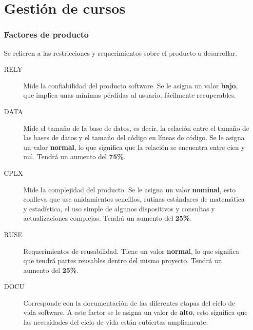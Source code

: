 \documentclass[11pt,a4paper,spanish,twoside]{book}
\begin{document}
\section{Gestión de cursos}
\subsubsection{Factores de producto}
Se refieren a las restricciones y requerimientos sobre el producto a
desarrollar.
\begin{description}
\item[RELY] Mide la confiabilidad del producto software. Se le asigna un 
valor \textbf{bajo}, que implica unas mínimas pérdidas al usuario,
fácilmente recuperables.

\item[DATA] Mide el tamaño de la base de datos, es decir, la relación entre
el tamaño de las bases de datos y el tamaño del código en líneas de código. Se
le asigna un valor \textbf{normal}, lo que significa que la relación se
encuentra entre cien y mil. Tendrá un aumento del \textbf{75\%}. 

\item[CPLX] Mide la complejidad del producto. Se le asigna un
valor \textbf{nominal}, esto conlleva que use anidamientos sencillos, rutinas
estándares de matemática y estadística, el uso simple de algunos dispositivos
y consultas y actualizaciones complejas. Tendrá un aumento del 
\textbf{25\%}.

\item[RUSE] Requerimientos de reusabilidad. Tiene un valor \textbf{normal},
lo que significa que tendrá partes reusables dentro del mismo
proyecto. Tendrá un aumento del \textbf{25\%}.

\item[DOCU] Corresponde con la documentación de las diferentes etapas del
ciclo de vida software. A este factor se le asigna un valor de \textbf{alto},
esto significa que las necesidades del ciclo de vida están cubiertas
ampliamente.

\end{description}
\end{document}
